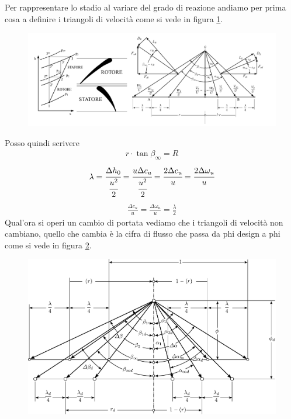 Per rappresentare lo stadio al variare del grado di reazione andiamo per prima cosa a definire i triangoli di velocità come si vede in figura \ref{fig:StadioRipetuto}.
\begin{figure}
\centering
  \includegraphics[width=\textwidth]{fig/StadioRipetuto.pdf}
\caption{}
\label{fig:StadioRipetuto}
\end{figure}
Posso quindi scrivere
\begin{align*}
r \cdot \tan \beta_{\infty} = R 
\end{align*}
\begin{align*}
\lambda = \cfrac{\Delta h_0}{\cfrac{u^2}{2}} = \cfrac{u \Delta c_u}{\cfrac{u^2}{2}} = \cfrac{2 \Delta c_u}{u} = \cfrac{2 \Delta \omega_u}{u}
\end{align*}
\begin{align*}
\frac{\Delta c_u}{u} = \frac{\Delta \omega_u}{u} = \frac{\lambda}{2}
\end{align*}
Qual'ora si operi un cambio di portata vediamo che i triangoli di velocità non cambiano, quello che cambia è la cifra di flusso che passa da phi design a phi come si vede in figura \ref{fig:CondFuoriProg}.
\begin{figure}
\centering
  \includegraphics[width=\textwidth]{fig/CondFuoriProg.pdf}
\caption{}
\label{fig:CondFuoriProg}
\end{figure}
